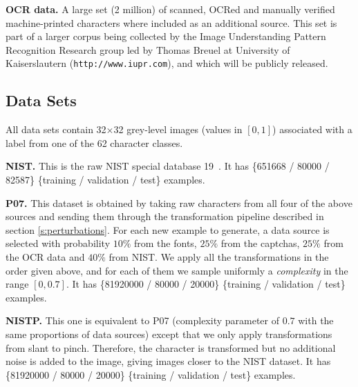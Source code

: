 \documentclass{article} %
\begin{document}
{\bf OCR data.}
A large set (2 million) of scanned, OCRed and manually verified machine-printed 
characters where included as an
additional source. This set is part of a larger corpus being collected by the Image Understanding
Pattern Recognition Research group led by Thomas Breuel at University of Kaiserslautern 
({\tt http://www.iupr.com}), and which will be publicly released.

\vspace*{-3mm}
\subsection{Data Sets}
\vspace*{-2mm}

All data sets contain 32$\times$32 grey-level images (values in $[0,1]$) associated with a label
from one of the 62 character classes.
\vspace*{-1mm}

{\bf NIST.} This is the raw NIST special database 19~\citep{Grother-1995}. It has
\{651668 / 80000 / 82587\} \{training / validation / test\} examples.
\vspace*{-1mm}

{\bf P07.} This dataset is obtained by taking raw characters from all four of the above sources
and sending them through the transformation pipeline described in section \ref{s:perturbations}.
For each new example to generate, a data source is selected with probability $10\%$ from the fonts,
$25\%$ from the captchas, $25\%$ from the OCR data and $40\%$ from NIST. We apply all the transformations in the
order given above, and for each of them we sample uniformly a \emph{complexity} in the range $[0,0.7]$.
It has \{81920000 / 80000 / 20000\} \{training / validation / test\} examples.
\vspace*{-1mm}

{\bf NISTP.} This one is equivalent to P07 (complexity parameter of $0.7$ with the same proportions of data sources)
  except that we only apply
  transformations from slant to pinch. Therefore, the character is
  transformed but no additional noise is added to the image, giving images
  closer to the NIST dataset. 
It has \{81920000 / 80000 / 20000\} \{training / validation / test\} examples.
\end{document}
